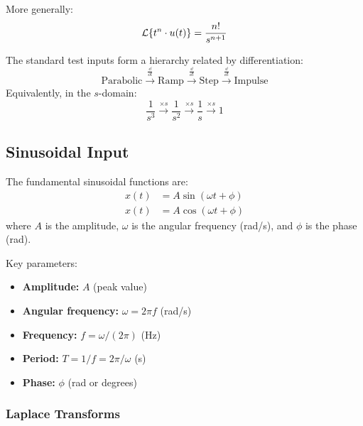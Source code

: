 More generally:
\begin{equation}
\mathcal{L}\{t^n \cdot u(t)\} = \frac{n!}{s^{n+1}}
\end{equation}

\begin{keyconceptbox}[title=Standard Test Input Hierarchy]
The standard test inputs form a hierarchy related by differentiation:
\begin{equation}
\text{Parabolic} \xrightarrow{\frac{\dd}{\dd t}} \text{Ramp} \xrightarrow{\frac{\dd}{\dd t}} \text{Step} \xrightarrow{\frac{\dd}{\dd t}} \text{Impulse}
\end{equation}
Equivalently, in the $s$-domain:
\begin{equation}
\frac{1}{s^3} \xrightarrow{\times s} \frac{1}{s^2} \xrightarrow{\times s} \frac{1}{s} \xrightarrow{\times s} 1
\end{equation}
\end{keyconceptbox}

\subsection{Sinusoidal Input}

\begin{definitionbox}[title=Definition 10.5: Sinusoidal Functions]
The fundamental sinusoidal functions are:
\begin{align}
x(t) &= A\sin(\omega t + \phi) \\
x(t) &= A\cos(\omega t + \phi)
\end{align}
where $A$ is the amplitude, $\omega$ is the angular frequency (rad/s), and $\phi$ is the phase (rad).
\end{definitionbox}

Key parameters:
\begin{itemize}
    \item \textbf{Amplitude:} $A$ (peak value)
    \item \textbf{Angular frequency:} $\omega = 2\pi f$ (rad/s)
    \item \textbf{Frequency:} $f = \omega/(2\pi)$ (Hz)
    \item \textbf{Period:} $T = 1/f = 2\pi/\omega$ (s)
    \item \textbf{Phase:} $\phi$ (rad or degrees)
\end{itemize}

\subsubsection{Laplace Transforms}

